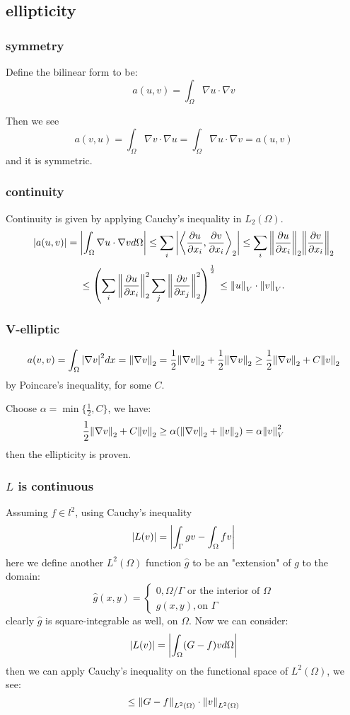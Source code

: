 \documentclass[12pt]{article} %
\newcommand{\1}[1]{\mathds{1}\left[#1\right]}
\begin{document}
\subsection{ellipticity}
\subsubsection{symmetry}
Define the bilinear form to be:
$$
	a(u, v) = \int_{\Omega}\nabla u\cdot\nabla v
$$

Then we see
$$
	a(v,u) = \int_{\Omega}\nabla v\cdot\nabla u = \int_{\Omega}\nabla u\cdot\nabla v = a(u,v)
$$ and it is symmetric.

\subsubsection{continuity}
Continuity is given by applying Cauchy's inequality in $L_2(\Omega)$.
$$
	\abs{a(u,v)} = \abs{\int_{\Omega}\nabla u \cdot\nabla vd\Omega}
	\le \sum_i \abs{\left<\frac{\partial u}{\partial x_i},\frac{\partial v}{\partial x_i}\right>_2}\\
	\le \sum_i \norm{\frac{\partial u}{\partial x_i}}_2 \norm{\frac{\partial v}{\partial x_i}}_2
$$
$$
	\le \left( \sum_i \norm{\frac{\partial u}{\partial x_i}}_2^2 \sum_j \norm{\frac{\partial v}{\partial x_j}}_2^2\right)^{\frac12}\\
	\le \norm{u}_V\cdot\norm{v}_V.
$$


\subsubsection{V-elliptic}
$$
	a(v,v) = \int_{\Omega}\abs{\nabla v}^2dx = \norm{\nabla v}_2 = \frac12\norm{\nabla v}_2 + \frac12\norm{\nabla v}_2 \ge \frac12\norm{\nabla v}_2 + C\norm{v}_2
$$ by Poincare's inequality, for some $C$.

Choose $\alpha = \min\{\frac12, C\}$, we have:
$$
	\frac12\norm{\nabla v}_2 + C\norm{v}_2 
	\ge
	\alpha(\norm{\nabla v}_2 + \norm{v}_2) = \alpha \norm{v}^2_V
$$ then the ellipticity is proven.

\subsubsection{$L$ is continuous}
Assuming $f\in l^2$, using Cauchy's inequality
$$
	\abs{L(v)} = \abs{\int_{\Gamma}gv - \int_{\Omega}fv}
$$ here we define another $L^2(\Omega)$ function $\hat{g}$ to be an "extension" of $g$ to the domain:
$$
	\hat{g}(x,y) = 
	\begin{cases}
		0, \Omega / \Gamma \text{ or the interior of $\Omega$} \\
		g(x,y), \text{on $\Gamma$}
	\end{cases}
$$ clearly $\hat{g}$ is square-integrable as well, on $\Omega$. Now we can consider:
$$
	\abs{L(v)} = \abs{\int_{\Omega}(G - f)vd\Omega}
$$ then we can apply Cauchy's inequality on the functional space of $L^2(\Omega)$, we see:
$$
	\le \norm{G-f}_{L^2(\Omega)} \cdot \norm{v}_{L^2(\Omega)}
$$
\end{document}
